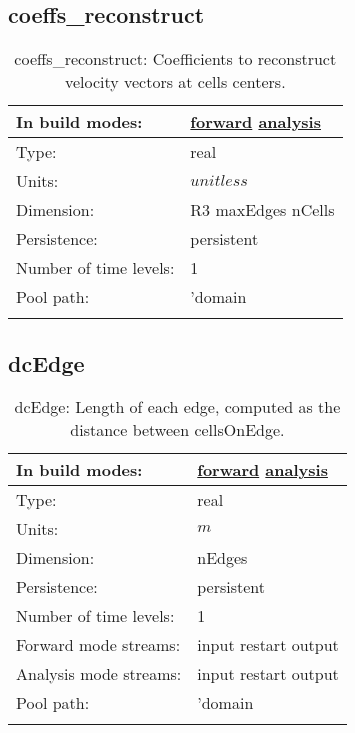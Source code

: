 \subsection[coeffs\_reconstruct]{coeffs\_reconstruct}
\label{subsec:var_sec_mesh_coeffs_reconstruct}
\begin{center}
\begin{longtable}{| p{2.0in} | p{4.0in} |}
        \hline 
        In build modes: & \hyperref[subsec:forward_var_tab_mesh]{forward} \hyperref[subsec:analysis_var_tab_mesh]{analysis} \\
        \hline 
        Type: & real \\
        \hline 
        Units: & $unitless$ \\
        \hline 
        Dimension: & R3 maxEdges nCells \\
        \hline 
        Persistence: & persistent \\
        \hline 
        Number of time levels: & 1 \\
        \hline 
            Pool path: & 'domain %
 \\
		 \hline 
    \caption{coeffs\_reconstruct: Coefficients to reconstruct velocity vectors at cells centers.}
\end{longtable}
\end{center}
\subsection[dcEdge]{dcEdge}
\label{subsec:var_sec_mesh_dcEdge}
\begin{center}
\begin{longtable}{| p{2.0in} | p{4.0in} |}
        \hline 
        In build modes: & \hyperref[subsec:forward_var_tab_mesh]{forward} \hyperref[subsec:analysis_var_tab_mesh]{analysis} \\
        \hline 
        Type: & real \\
        \hline 
        Units: & $m$ \\
        \hline 
        Dimension: & nEdges \\
        \hline 
        Persistence: & persistent \\
        \hline 
        Number of time levels: & 1 \\
        \hline 
		 Forward mode streams: &  input restart output \\
        \hline 
		 Analysis mode streams: &  input restart output \\
        \hline 
            Pool path: & 'domain %
 \\
		 \hline 
    \caption{dcEdge: Length of each edge, computed as the distance between cellsOnEdge.}
\end{longtable}
\end{center}
